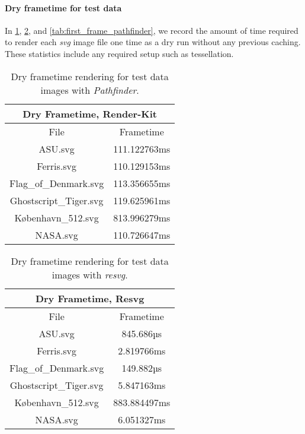 \paragraph{Dry frametime for test data}
In \cref{tab:first_frame_renderkit}, \cref{tab:first_frame_resvg}, and \cref{tab:first_frame_pathfinder}, we record the amount of time required to render each \textit{svg} image file one time as a dry run without any previous caching. These statistics include any required setup such as tessellation.\medskip

\begin{table}[H]
\centering
\begin{tabular}{ |c|c| }
\hline
\multicolumn{2}{|c|}{Dry Frametime, Render-Kit}\\
\hline
File&Frametime\\
\hline
ASU.svg&111.122763ms\\
\hline
Ferris.svg&110.129153ms\\
\hline
Flag\_of\_Denmark.svg&113.356655ms\\
\hline
Ghostscript\_Tiger.svg&119.625961ms\\
\hline
København\_512.svg&813.996279ms\\
\hline
NASA.svg&110.726647ms\\
\hline
\end{tabular}
\caption{Dry frametime rendering for test data images with \textit{Pathfinder}.\label{tab:first_frame_renderkit}}
\end{table}
\medskip

\begin{table}[H]
\centering
\begin{tabular}{ |c|c| }
\hline
\multicolumn{2}{|c|}{Dry Frametime, Resvg}\\
\hline
File&Frametime\\
\hline
ASU.svg&845.686µs\\
\hline
Ferris.svg&2.819766ms\\
\hline
Flag\_of\_Denmark.svg&149.882µs\\
\hline
Ghostscript\_Tiger.svg&5.847163ms\\
\hline
København\_512.svg&883.884497ms\\
\hline
NASA.svg&6.051327ms\\
\hline
\end{tabular}
\caption{Dry frametime rendering for test data images with \textit{resvg}.\label{tab:first_frame_resvg}}
\end{table}
\medskip

